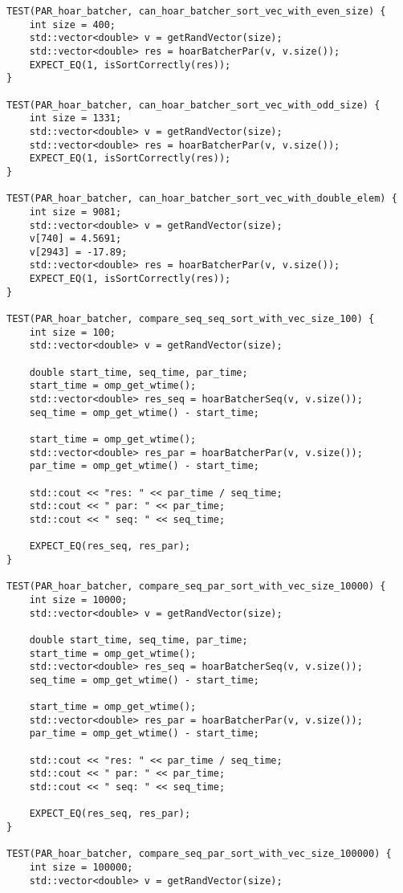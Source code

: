 \documentclass{report}
\begin{document}
\begin{lstlisting}
TEST(PAR_hoar_batcher, can_hoar_batcher_sort_vec_with_even_size) {
    int size = 400;
    std::vector<double> v = getRandVector(size);
    std::vector<double> res = hoarBatcherPar(v, v.size());
    EXPECT_EQ(1, isSortCorrectly(res));
}

TEST(PAR_hoar_batcher, can_hoar_batcher_sort_vec_with_odd_size) {
    int size = 1331;
    std::vector<double> v = getRandVector(size);
    std::vector<double> res = hoarBatcherPar(v, v.size());
    EXPECT_EQ(1, isSortCorrectly(res));
}

TEST(PAR_hoar_batcher, can_hoar_batcher_sort_vec_with_double_elem) {
    int size = 9081;
    std::vector<double> v = getRandVector(size);
    v[740] = 4.5691;
    v[2943] = -17.89;
    std::vector<double> res = hoarBatcherPar(v, v.size());
    EXPECT_EQ(1, isSortCorrectly(res));
}

TEST(PAR_hoar_batcher, compare_seq_seq_sort_with_vec_size_100) {
    int size = 100;
    std::vector<double> v = getRandVector(size);

    double start_time, seq_time, par_time;
    start_time = omp_get_wtime();
    std::vector<double> res_seq = hoarBatcherSeq(v, v.size());
    seq_time = omp_get_wtime() - start_time;

    start_time = omp_get_wtime();
    std::vector<double> res_par = hoarBatcherPar(v, v.size());
    par_time = omp_get_wtime() - start_time;

    std::cout << "res: " << par_time / seq_time;
    std::cout << " par: " << par_time;
    std::cout << " seq: " << seq_time;

    EXPECT_EQ(res_seq, res_par);
}

TEST(PAR_hoar_batcher, compare_seq_par_sort_with_vec_size_10000) {
    int size = 10000;
    std::vector<double> v = getRandVector(size);

    double start_time, seq_time, par_time;
    start_time = omp_get_wtime();
    std::vector<double> res_seq = hoarBatcherSeq(v, v.size());
    seq_time = omp_get_wtime() - start_time;

    start_time = omp_get_wtime();
    std::vector<double> res_par = hoarBatcherPar(v, v.size());
    par_time = omp_get_wtime() - start_time;

    std::cout << "res: " << par_time / seq_time;
    std::cout << " par: " << par_time;
    std::cout << " seq: " << seq_time;

    EXPECT_EQ(res_seq, res_par);
}

TEST(PAR_hoar_batcher, compare_seq_par_sort_with_vec_size_100000) {
    int size = 100000;
    std::vector<double> v = getRandVector(size);


\end{lstlisting}
\end{document}
